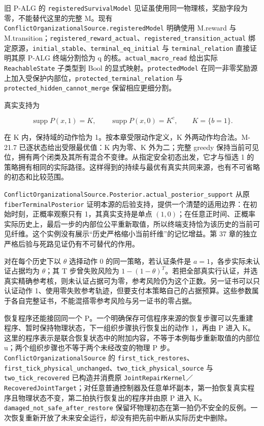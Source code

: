 \documentclass[
  11pt,
  oneside]{book}
\begin{document}
旧 P-ALG 的 \nolinkurl{registeredSurvivalModel} 见证虽使用同一物理核，奖励字段为零，不能替代这里的完整 M。现有 \nolinkurl{ConflictOrganizationalSource.registeredModel} 明确使用 M.reward 与 M.transition；\nolinkurl{registered_reward_actual}、\nolinkurl{registered_transition_actual} 绑定原源，\nolinkurl{initial_stable}、\nolinkurl{terminal_eq_initial} 与 \nolinkurl{terminal_relation} 直接证明其原 P-ALG 终端分割恰为 q 的核。\nolinkurl{actual_macro_read} 给出实际 \nolinkurl{ReachableState} 子类型到 Bool 的显式映射。\nolinkurl{protectedModel} 在同一非零奖励源上加入受保护内部位，\nolinkurl{protected_terminal_relation} 与 \nolinkurl{protected_hidden_cannot_merge} 保留相应更细分割。

真实支持为

\[\operatorname{supp}P(x,1)=K,\qquad
\operatorname{supp}P(x,0)=K^c,\qquad K=\{b=1\}.\]

在 K 内，保持域的动作恰为 1。按本章受限动作定义，K 外两动作均合法。M-21.7 已逐状态给出受限最优值：K 内为零、K 外为二；完整 greedy 保持当前可见位，拥有两个闭类及其所有混合不变律。从指定安全初态出发，它才与恒选 1 的策略拥有相同的实际路径。这样得到的持续与最优有真实共同来源，也有不可省略的初态和比较范围。

\nolinkurl{ConflictOrganizationalSource.Posterior.actual_posterior_support} 从原 \nolinkurl{fiberTerminalPosterior} 证明本源的后验支持，提供一个清楚的适用边界：在初始时刻，正概率观察只有 1，其真实支持是单点 \((1,0)\)；在任意正时间、正概率实际历史上，最后一步的内部位公平重新取值，所以终端支持恰为该历史的当前可见纤维。这个实例没有展示``历史严格缩小当前纤维''的记忆增益。第 37 章的独立严格后验与死路见证仍有不可替代的作用。

对在每个历史下以 \(\theta\) 选择动作 0 的同一策略，若认证条件是 \(a=1\)，各步实际未认证占据均为 \(\theta\)；其 T 步曾失败风险为 \(1-(1-\theta)^T\)。若把全部真实行认证，并选真实精确参考核，则未认证占据可为零，参考风险仍为这个正数。另一证书可以只认证动作 1、使用零失败参考轨迹，但要支付本策略自己的占据预算。这些参数属于各自完整证书，不能混搭零参考风险与另一证书的零占据。

恢复程序还能接回同一个 P。一个明确保存可信程序来源的恢复步骤可以先重建程序、暂时保持物理状态，下一组织步骤执行恢复出的动作 1，再由 P 进入 K。这里的程序表示是联合恢复状态中的附加内容，不等于本例每步重新取值的内部位 u；两个组织步骤也不等于两个未经改变的物理 P 步。\nolinkurl{ConflictOrganizationalSource} 的 \nolinkurl{first_tick_restores}、\nolinkurl{first_tick_physical_unchanged}、\nolinkurl{two_tick_physical_source} 与 \nolinkurl{two_tick_recovered} 已构造并消费原 \nolinkurl{JointRepairKernel}／\nolinkurl{RecoveredJointTarget}；对任意普通控制器及任意单坏副本，第一拍恢复真实程序且物理状态不变，第二拍执行恢复出的程序并由原 P 进入 K。\nolinkurl{damaged_not_safe_after_restore} 保留坏物理初态在第一拍仍不安全的反例。一次恢复重新开放了未来安全运行，却没有把先前中断从实际历史中删除。
\end{document}
